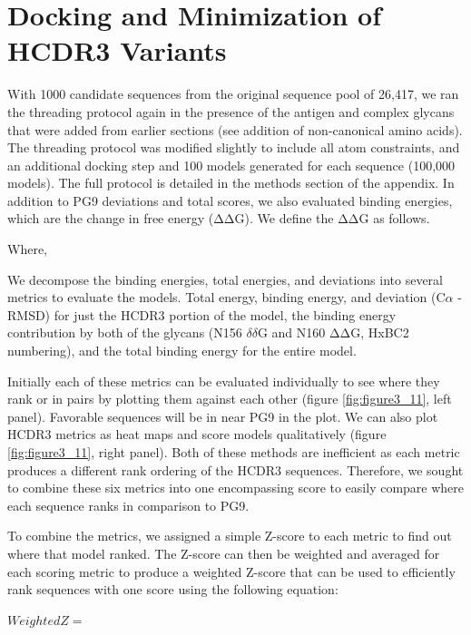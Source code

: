 \section{Docking and Minimization of HCDR3 Variants}
With 1000 candidate sequences from the original sequence pool of 26,417, we ran the threading protocol again in the presence of the antigen and complex glycans that were added from earlier sections (see addition of non-canonical amino acids). The threading protocol was modified slightly to include all atom constraints, and an additional docking step and 100 models generated for each sequence (100,000 models). The full protocol is detailed in the methods section of the appendix.
In addition to PG9 deviations and total scores, we also evaluated binding energies, which are the change in free energy (ΔΔG). We define the ΔΔG as follows.


Where,


We decompose the binding energies, total energies, and deviations into several metrics to evaluate the models. Total energy, binding energy, and deviation (C$\alpha$ - RMSD) for just the HCDR3 portion of the model, the binding energy contribution by both of the glycans (N156 $\delta\delta$G and N160 ΔΔG, HxBC2 numbering), and the total binding energy for the entire model.

Initially each of these metrics can be evaluated individually to see where they rank or in pairs by plotting them against each other (figure \ref{fig:figure3_11}, left panel). Favorable sequences will be in near PG9 in the plot. We can also plot HCDR3 metrics as heat maps and score models qualitatively (figure \ref{fig:figure3_11}, right panel). Both of these methods are inefficient as each metric produces a different rank ordering of the HCDR3 sequences. Therefore, we sought to combine these six metrics into one encompassing score to easily compare where each sequence ranks in comparison to PG9.

To combine the metrics, we assigned a simple Z-score to each metric to find out where that model ranked. The Z-score can then be weighted and averaged for each scoring metric to produce a weighted Z-score that can be used to efficiently rank sequences with one score using the following equation:

$Weighted Z = $


